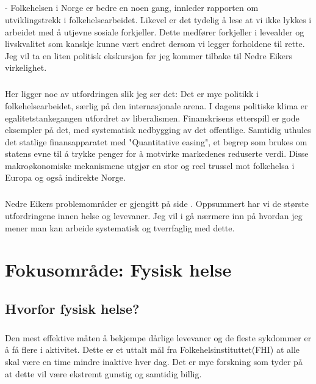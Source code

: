 \documentclass[11pt]{memoir} %
\begin{document}
		\paragraph{}
			- Folkehelsen i Norge er bedre en noen gang, innleder rapporten om utviklingstrekk i folkehelsearbeidet\cite{Utvtrekk}. Likevel er det tydelig å lese at vi ikke lykkes i arbeidet med å utjevne sosiale forkjeller. Dette medfører forkjeller i levealder og livskvalitet som kanskje kunne vært endret dersom vi legger forholdene til rette. Jeg vil ta en liten politisk ekskursjon før jeg kommer tilbake til Nedre Eikers virkelighet.

		\paragraph{}
			Her ligger noe av utfordringen slik jeg ser det: Det er mye politikk i folkehelsearbeidet, særlig på den internasjonale arena. I dagens politiske klima er egalitetstankegangen utfordret av liberalismen. Finanskrisens etterspill er gode eksempler på det, med systematisk nedbygging av det offentlige. Samtidig uthules det statlige finansapparatet med "Quantitative easing", et begrep som brukes om statens evne til å trykke penger for å motvirke markedenes reduserte verdi. Disse makroøkonomiske mekanismene utgjør en stor og reel trussel mot folkehelsa i Europa og også indirekte Norge.

		\paragraph{}
			Nedre Eikers problemområder er gjengitt på side \pageref{fhprofilnekbilde}. Oppsummert har vi de største utfordringene innen helse og levevaner. Jeg vil i  gå nærmere inn på hvordan jeg mener man kan arbeide systematisk og tverrfaglig med dette. 

\chapter{Fokusområde: Fysisk helse}\label{chap:fok}
	\section{Hvorfor fysisk helse?}
		\paragraph{}
			Den mest effektive måten å bekjempe dårlige levevaner og de fleste sykdommer er å få flere i aktivitet. Dette er et uttalt mål fra Folkehelsinstituttet(FHI)\cite{htnorge} at alle skal være en time mindre inaktive hver dag. Det er mye forskning som tyder på at dette vil være ekstremt gunstig og samtidig billig.
\end{document}
